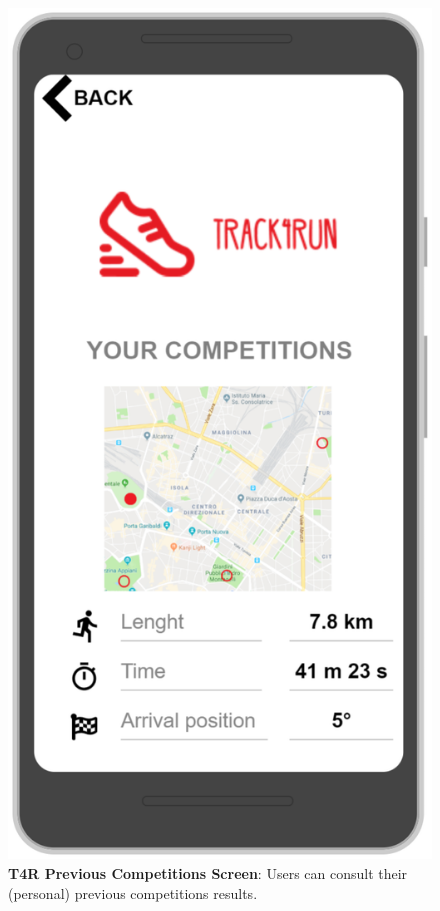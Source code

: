 \begin{figure}[H]
\centering
\includegraphics[scale = 0.5]{Mocks/Mobile_T4R_Prev_Competitions.PNG}
\caption{\textbf{T4R Previous Competitions Screen}: Users can consult their (personal) previous competitions results.}
\end{figure}

